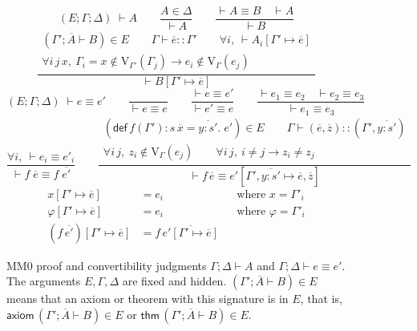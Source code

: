 \documentclass[runningheads]{llncs}
\begin{document}
\begin{figure}
  $$\boxed{(E;\Gamma;\Delta)\;\vdash A}\qquad \dfrac{A\in\Delta}{\vdash A}\qquad
  \dfrac{\vdash A\equiv B\quad \vdash A}{\vdash B}$$\vspace{1pt}
  $$\dfrac{\begin{gathered}
    (\Gamma';\overline{A}\vdash B)\in E\qquad \Gamma\vdash\overline{e}::\Gamma'\qquad \forall i,\ \vdash A_i[\Gamma'\mapsto \overline{e}]\\
    \forall i\,j\,x,\ \Gamma_i=x\notin\mathrm{V}_{\Gamma'}(\Gamma_j)\to e_i\notin \mathrm{V}_\Gamma(e_j)
  \end{gathered}}{\vdash B[\Gamma'\mapsto \overline{e}]}$$\vspace{3pt}
  $$\boxed{(E;\Gamma;\Delta)\;\vdash e\equiv e'}\qquad \dfrac{}{\vdash e\equiv e}\qquad
  \dfrac{\vdash e\equiv e'}{\vdash e'\equiv e}\qquad
  \dfrac{\vdash e_1\equiv e_2\quad \vdash e_2\equiv e_3}{\vdash e_1\equiv e_3}$$\vspace{1pt}
  $$\dfrac{\forall i,\ {\vdash e_i\equiv e'_i}}{\vdash f\;\overline{e}\equiv f\;\overline{e'}}\qquad
  \dfrac{\begin{gathered}
    (\mathsf{def}\,f(\Gamma'):s\,\overline{x}=\overline{y:s'}.\;e')\in E\qquad
    \Gamma\vdash(\overline{e},\overline{z})::(\Gamma',\overline{y:s'})\\
    \forall i\,j,\ z_i\notin \mathrm{V}_\Gamma(e_j)\qquad
    \forall i\,j,\ i\ne j\to z_i\ne z_j
  \end{gathered}}{\vdash f\,\overline{e}\equiv e'[\Gamma',\overline{y:s'}\mapsto\overline{e},\overline{z}]}$$\vspace{-5pt}
  \begin{align*}
    x[\Gamma'\mapsto \overline{e}]&=e_i&&\mbox{where $x=\Gamma'_i$}\\
    \varphi[\Gamma'\mapsto \overline{e}]&=e_i&&\mbox{where $\varphi=\Gamma'_i$}\\
    (f\,\overline{e'})[\Gamma'\mapsto \overline{e}]&=f\,\overline{e'[\Gamma'\mapsto \overline{e}]}
  \end{align*}\vspace{-10pt}
  \caption{MM0 proof and convertibility judgments $\Gamma;\Delta\vdash A$ and $\Gamma;\Delta\vdash e\equiv e'$. The arguments $E,\Gamma,\Delta$ are fixed and hidden. $(\Gamma';\overline{A}\vdash B)\in E$ means that an axiom or theorem with this signature is in $E$, that is, $\mathsf{axiom}\,(\Gamma';\overline{A}\vdash B)\in E$ or $\mathsf{thm}\,(\Gamma';\overline{A}\vdash B)\in E$.}
  \label{fig:proof}
\end{figure}
\end{document}
